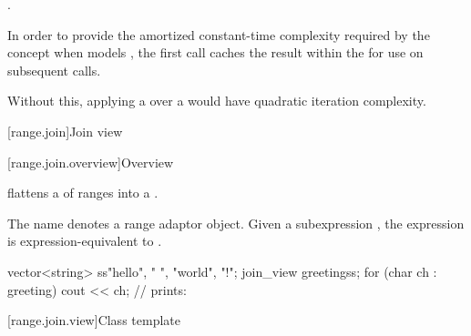 \begin{itemdescr}
\pnum
\returns
{}.

\pnum
\remarks
In order to provide the amortized constant-time complexity
required by the  concept
when  models ,
the first call caches the result within the 
for use on subsequent calls.
\begin{note}
Without this,
applying a  over a 
would have quadratic iteration complexity.
\end{note}
\end{itemdescr}

[range.join]{Join view}

[range.join.overview]{Overview}

\pnum
{} flattens a  of ranges into a
.

\pnum
The name  denotes a
range adaptor object.
Given a subexpression , the expression
 is expression-equivalent to
.

\pnum
\begin{example}
\begin{codeblock}
vector<string> ss{"hello", " ", "world", "!"};
join_view greeting{ss};
for (char ch : greeting)
  cout << ch;                                   // prints: 
\end{codeblock}
\end{example}

[range.join.view]{Class template }

